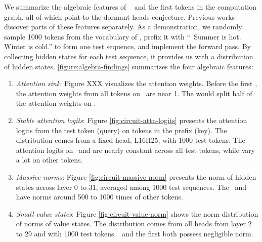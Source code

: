 We summarize the algebraic features of \bos~ and the first \delim tokens in the computation graph, all of which point to the dormant heads conjecture. Previous works discover parts of these features separately. As a demonstration, we randomly sample 1000 tokens from the vocabulary of \llama, prefix it with ``\bos~Summer is hot. Winter is cold.'' to form one test sequence, and implement the forward pass. By collecting  hidden states for each test sequence, it provides us with a distribution of hidden states.
\ref{figure:algebra-findings} summarizes the four algebraic features:
\begin{enumerate}
    \item \textit{Attention sink}: Figure XXX visualizes the attention weights. Before the first \delim, the attention weights from all tokens on \bos~are near 1. The \delim would split half of the attention weights on \bos.
    \item \textit{Stable attention logits}: Figure \ref{fig:circuit-attn-logits} presents the attention logits from the test token (query) on tokens in the prefix (key). The distribution comes from a fixed head, L16H25, with 1000 test tokens. The attention logits on \bos~and \delim are nearly constant across all test tokens, while vary a lot on other tokens. 
    \item \textit{Massive norms}: Figure \ref{fig:circuit-massive-norm} presents the norm of hidden states across layer 0 to 31, averaged among 1000 test sequences. The \bos~and \delim have norms around 500 to 1000 times of other tokens.
    \item \textit{Small value states}: Figure \ref{fig:circuit-value-norm} shows the norm distribution of norms of value states. The distribution comes from all heads from layer 2 to 29 and with 1000 test tokens. \bos~and the first \delim both possess negligible norm.
\end{enumerate}

